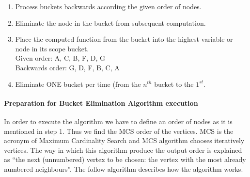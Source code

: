 \begin{enumerate}
\item Process buckets backwards according the given order of nodes.
\item Eliminate the node in the bucket from subsequent computation.
\item Place the computed function from the bucket into the highest variable or node in its scope bucket. \\
Given order: A, C, B, F, D, G \\
Backwards order: G, D, F, B, C, A
\item Eliminate ONE bucket per time (from the $n^{th}$ bucket to the $1^{st}$. 
\end{enumerate}

\paragraph{Preparation for Bucket Elimination Algorithm execution} 
In order to execute the algorithm we have to define an order of nodes as it is mentioned in step 1. Thus we find the MCS order of the vertices. MCS is the acronym of Maximum Cardinality Search and MCS algorithm chooses iteratively vertices. The way in which this algorithm produce the output order is explained as  “the next (unnumbered) vertex to be chosen: the vertex with the most already numbered neighbours”. The follow algorithm describes how the algorithm works.

